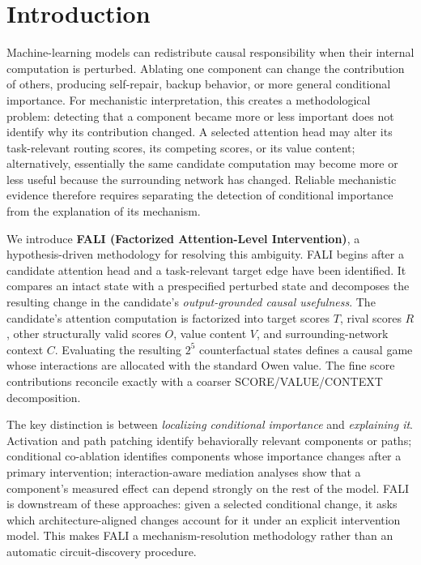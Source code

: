 \section{Introduction}\label{sec:introduction}

Machine-learning models can redistribute causal responsibility when their internal computation is perturbed. Ablating one component can change the contribution of others, producing self-repair, backup behavior, or more general conditional importance. For mechanistic interpretation, this creates a methodological problem: detecting that a component became more or less important does not identify why its contribution changed. A selected attention head may alter its task-relevant routing scores, its competing scores, or its value content; alternatively, essentially the same candidate computation may become more or less useful because the surrounding network has changed. Reliable mechanistic evidence therefore requires separating the detection of conditional importance from the explanation of its mechanism.

We introduce \textbf{FALI (Factorized Attention-Level Intervention)}, a hypothesis-driven methodology for resolving this ambiguity. FALI begins after a candidate attention head and a task-relevant target edge have been identified. It compares an intact state with a prespecified perturbed state and decomposes the resulting change in the candidate's \emph{output-grounded causal usefulness}. The candidate's attention computation is factorized into target scores $T$, rival scores $R$, other structurally valid scores $O$, value content $V$, and surrounding-network context $C$. Evaluating the resulting $2^5$ counterfactual states defines a causal game whose interactions are allocated with the standard Owen value. The fine score contributions reconcile exactly with a coarser SCORE/VALUE/CONTEXT decomposition.

The key distinction is between \emph{localizing conditional importance} and \emph{explaining it}. Activation and path patching identify behaviorally relevant components or paths; conditional co-ablation identifies components whose importance changes after a primary intervention; interaction-aware mediation analyses show that a component's measured effect can depend strongly on the rest of the model. FALI is downstream of these approaches: given a selected conditional change, it asks which architecture-aligned changes account for it under an explicit intervention model. This makes FALI a mechanism-resolution methodology rather than an automatic circuit-discovery procedure.

